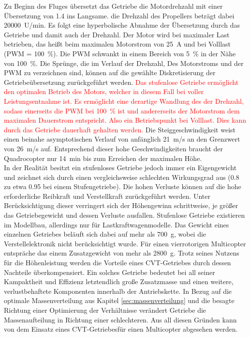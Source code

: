 Zu Beginn des Fluges übersetzt das Getriebe die Motordrehzahl mit einer Übersetzung von \SI{1,4}{} ins Langsame. die Drehzahl des Propellers beträgt dabei \SI{20000}{U/min}. Es folgt eine hyperbolische Abnahme der Übersetzung durch das Getriebe und damit auch der Drehzahl. Der Motor wird bei maximaler Last betrieben, das heißt beim maximalen Motorstrom von \SI{25}{A} und bei Volllast (PWM =  \SI{100}{\%}). Die PWM schwankt in einem Bereich von \SI{5}{\%} in der Nähe von \SI{100}{\%}. Die Sprünge, die im Verlauf der Drehzahl, Des Motorstroms und der PWM zu verzeichnen sind, können auf die gewählte Diskretisierung der Getriebeübersetzung zurückgeführt werden. \textcolor{red}{Das stufenlose Getriebe ermöglicht den optimalen Betrieb des Motors, welcher in diesem Fall bei voller Leistungsentnahme ist. Es ermöglicht eine derartige Wandlung des der Drehzahl, sodass einerseits die PWM bei \SI{100}{\%} ist und andererseits der Motorstrom dem maximalen Dauerstrom entspricht. Also ein Betriebspunkt bei Volllast. Dies kann durch das Getriebe dauerhaft gehalten werden.} 
Die Steiggeschwindigkeit weist einen beinahe asymptotischen Verlauf von anfänglich \SI{21}{m/s} an den Grenzwert von \SI{26}{m/s} auf. Entsprechend dieser hohe Geschwindigkeiten braucht der Quadrocopter nur \SI{14}{min} bis zum Erreichen der maximalen Höhe. \\
In der Realität besitzt ein stufenloses Getriebe jedoch immer ein Eigengewicht und zeichnet sich durch einen vergleichsweise schlechten Wirkungsgrad aus (\SI{0.8}{} zu etwa \SI{0.95}{} bei einem Stufengetriebe).
 Die hohen Verluste können auf die hohe erforderliche Reibkraft und Verstellkraft zurückgeführt werden. Unter Berücksichtigung dieser verringert sich der Höhengewinn schrittweise, je größer das Getriebegewicht und dessen Verluste ausfallen. Stufenlose Getriebe existieren im Modellbau, allerdings nur für Lastkraftwagenmodelle. Das Gewicht eines einzelnen Getriebes beläuft sich dabei auf mehr als \SI{700}{g}, wobei die Verstellelektronik nicht berücksichtigt wurde. Für einen vierrotorigen Multicopter entspräche das einem Zusatzgewicht von mehr als \SI{2800}{g}. 
Trotz seines Nutzens für die Höhenleistung werden die Vorteile eines CVT-Getriebes durch dessen Nachteile überkompensiert. Ein solches Getriebe bedeutet bei all seiner Kampaktheit und Effizienz letztendlich große Zusatzmasse und einen weitere, verlustbehaftete Komponenten innerhalb der Antriebskette. In Bezug auf die optimale Massenverteilung aus Kapitel \ref{sec:massenverteilung} und die besagte Richtung einer Optimierung der Verhältnisse verändert Getriebe die Massenaufteilung in Richtung einer schlechteren. Aus all diesen Gründen kann von dem Einsatz eines CVT-Getriebesfür einen Multicopter abgesehen werden.



